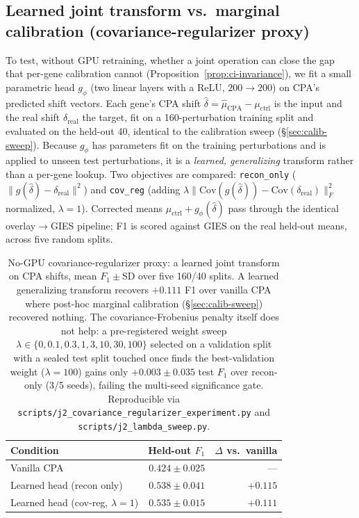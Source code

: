 \documentclass{article}
\theoremstyle{plain}
\theoremstyle{definition}
\theoremstyle{remark}
\begin{document}
\subsection{Learned joint transform vs.\ marginal calibration (covariance-regularizer proxy)}
\label{app:j2}
To test, without GPU retraining, whether a joint operation can close the gap that per-gene calibration cannot (Proposition~\ref{prop:ci-invariance}), we fit a small parametric head $g_\phi$ (two linear layers with a ReLU, $200{\to}200$) on CPA's predicted shift vectors. Each gene's CPA shift $\hat\delta = \hat\mu_{\text{CPA}} - \mu_{\text{ctrl}}$ is the input and the real shift $\delta_{\text{real}}$ the target, fit on a 160-perturbation training split and evaluated on the held-out 40, identical to the calibration sweep (\S\ref{sec:calib-sweep}). Because $g_\phi$ has parameters fit on the training perturbations and is applied to unseen test perturbations, it is a \emph{learned, generalizing} transform rather than a per-gene lookup. Two objectives are compared: \texttt{recon\_only} ($\lVert g(\hat\delta)-\delta_{\text{real}}\rVert^2$) and \texttt{cov\_reg} (adding $\lambda\lVert\mathrm{Cov}(g(\hat\delta))-\mathrm{Cov}(\delta_{\text{real}})\rVert_F^2$ normalized, $\lambda=1$). Corrected means $\mu_{\text{ctrl}}+g_\phi(\hat\delta)$ pass through the identical overlay$\to$GIES pipeline; F1 is scored against GIES on the real held-out means, across five random splits.

\begin{table}[h]
\centering
\small
\begin{tabular}{lrr}
\toprule
\textbf{Condition} & \textbf{Held-out $F_1$} & \textbf{$\Delta$ vs.\ vanilla} \\
\midrule
Vanilla CPA              & $0.424 \pm 0.025$ & --- \\
Learned head (recon only) & $0.538 \pm 0.041$ & $+0.115$ \\
Learned head (cov-reg, $\lambda{=}1$) & $0.535 \pm 0.015$ & $+0.111$ \\
\bottomrule
\end{tabular}
\caption{No-GPU covariance-regularizer proxy: a learned joint transform on CPA shifts, mean $F_1\pm$SD over five 160/40 splits. A learned generalizing transform recovers $+0.111$ F1 over vanilla CPA where post-hoc marginal calibration (\S\ref{sec:calib-sweep}) recovered nothing. The covariance-Frobenius penalty itself does not help: a pre-registered weight sweep $\lambda\in\{0,0.1,0.3,1,3,10,30,100\}$ selected on a validation split with a sealed test split touched once finds the best-validation weight ($\lambda{=}100$) gains only $+0.003\pm0.035$ test $F_1$ over recon-only (3/5 seeds), failing the multi-seed significance gate. Reproducible via \texttt{scripts/j2\_covariance\_regularizer\_experiment.py} and \texttt{scripts/j2\_lambda\_sweep.py}.}
\label{tab:j2}
\end{table}
\end{document}
